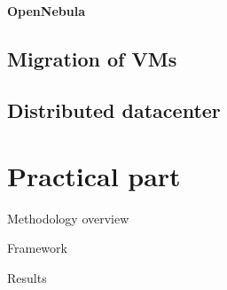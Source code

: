 \documentclass[12pt,oneside,a4paper]{report} %
\begin{document}
			\subsubsection{OpenNebula}

	\section{Migration of VMs}

	\section{Distributed datacenter}

	\pagebreak

\chapter{Practical part}

	Methodology overview
	\cite{6735439}

	Framework

	Results


\printglossary[type=acronym,title=List of Abbreviations,toctitle=List of Abbreviations]

\newpage
{} \label{listoffig}
\listoffigures

\newpage
{} \label{listoftab}
\listoftables
\cleardoublepage

{}




\end{document}
